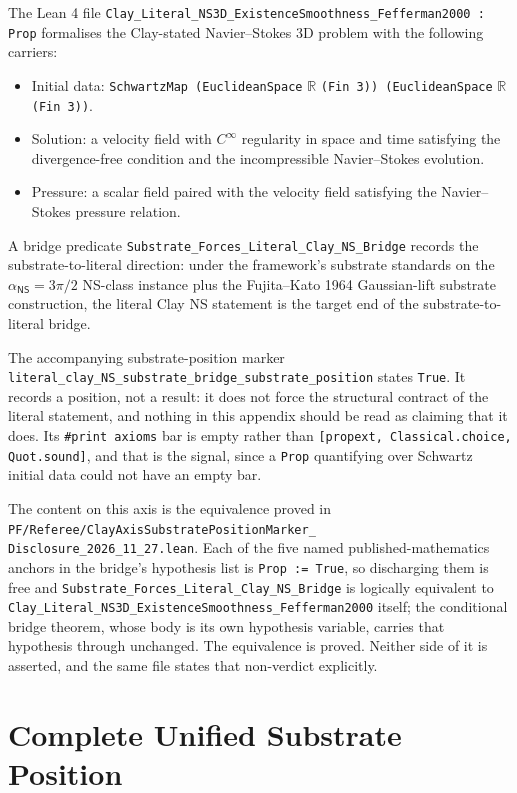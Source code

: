 The Lean 4 file
\verb|Clay_Literal_NS3D_ExistenceSmoothness_Fefferman2000 : Prop|
formalises the Clay-stated Navier--Stokes 3D problem with the
following carriers:
\begin{itemize}
  \item Initial data: \texttt{SchwartzMap (EuclideanSpace} $\mathbb{R}$
    \texttt{(Fin 3)) (EuclideanSpace} $\mathbb{R}$ \texttt{(Fin 3))}.
  \item Solution: a velocity field with $C^\infty$ regularity in space
    and time satisfying the divergence-free condition and the
    incompressible Navier--Stokes evolution.
  \item Pressure: a scalar field paired with the velocity field
    satisfying the Navier--Stokes pressure relation.
\end{itemize}
A bridge predicate
\verb|Substrate_Forces_Literal_Clay_NS_Bridge|
records the substrate-to-literal direction: under the framework's
substrate standards on the $\alpha_{\textsf{NS}} = 3\pi/2$
NS-class instance plus the Fujita--Kato 1964 Gaussian-lift
substrate construction, the literal Clay NS statement is the
target end of the substrate-to-literal bridge.

The accompanying substrate-position marker
\verb|literal_clay_NS_substrate_bridge_substrate_position|
states \texttt{True}. It records a position, not a result: it does
not force the structural contract of the literal statement, and
nothing in this appendix should be read as claiming that it does.
Its \verb|#print axioms| bar is empty rather than
\texttt{[propext, Classical.choice, Quot.sound]}, and that is the
signal, since a \texttt{Prop} quantifying over Schwartz initial
data could not have an empty bar.

The content on this axis is the equivalence proved in
\texttt{PF/Referee/ClayAxisSubstratePositionMarker\_\\
Disclosure\_2026\_11\_27.lean}. Each of the five named
published-mathematics anchors in the bridge's hypothesis list is
\verb|Prop := True|, so discharging them is free and
\verb|Substrate_Forces_Literal_Clay_NS_Bridge| is logically
equivalent to
\verb|Clay_Literal_NS3D_ExistenceSmoothness_Fefferman2000|
itself; the conditional bridge theorem, whose body is its own
hypothesis variable, carries that hypothesis through unchanged.
The equivalence is proved. Neither side of it is asserted, and the
same file states that non-verdict explicitly.

\section{Complete Unified Substrate Position}
\label{sec:complete-unified-substrate-position}

